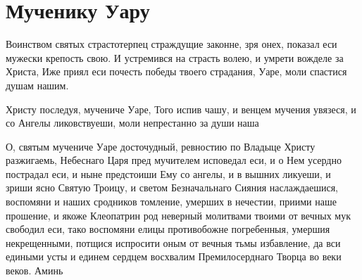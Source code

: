 \section{Мученику Уару}\begin{mymulticols}




Воинством святых страстотерпец страждущие законне, зря онех, показал еси мужески крепость свою. И устремився на страсть волею, и умрети вожделе за Христа, Иже приял еси почесть победы твоего страдания, Уаре, моли спастися душам нашим.




Христу последуя, мучениче Уаре, Того испив чашу, и венцем мучения увязеся, и со Ангелы ликовствуеши, моли непрестанно за души наша




О, святым мучениче Уаре досточудный, ревностию по Владыце Христу разжигаемь, Небеснаго Царя пред мучителем исповедал еси, и о Нем усердно пострадал еси, и ныне предстоиши Ему со ангелы, и в вышних ликуеши, и зриши ясно Святую Троицу, и светом Безначальнаго Сияния наслаждаешися, воспомяни и наших сродников томление, умерших в нечестии, приими наше прошение, и якоже Клеопатрин род неверный молитвами твоими от вечных мук свободил еси, тако воспомяни елицы противобожне погребенныя, умершия некрещенными, потщися испросити оным от вечныя тьмы избавление, да вси едиными усты и единем сердцем восхвалим Премилосерднаго Творца во веки веков. Аминь

\end{mymulticols}

\mychapterending


 


